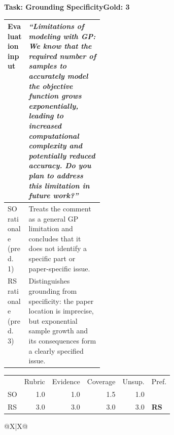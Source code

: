 \begin{table}[!t]
\vspace{0.7\baselineskip}
\begin{minipage}{\textwidth}
\hfuzz=2pt
\normalsize\linespread{1.05}\selectfont
\renewcommand{\arraystretch}{1.08}
\textbf{Task: Grounding Specificity}\hfill\textbf{Gold: 3}\\[2pt]
\begin{tabularx}{0.95\linewidth}{@{}>{\raggedright\arraybackslash}p{0.22\linewidth}X@{}}
\toprule
Evaluation input & \textit{``Limitations of modeling with GP: We know that the
required number of samples to accurately model the objective function grows
exponentially, leading to increased computational complexity and potentially
reduced accuracy. Do you plan to address this limitation in future work?''} \\
\midrule
SO rationale (pred. 1) & Treats the comment as a general GP limitation and
concludes that it does not identify a specific part or paper-specific issue. \\
RS rationale (pred. 3) & Distinguishes grounding from specificity: the paper
location is imprecise, but exponential sample growth and its consequences form
a clearly specified issue. \\
\bottomrule
\end{tabularx}
\vspace{2pt}
{\normalsize
\setlength{\tabcolsep}{0.6pt}
\begin{tabular*}{0.95\linewidth}{@{\extracolsep{\fill}}lrrrrl@{}}
& Rubric & Evidence & Coverage & Unsup. & Pref. \\
SO & 1.0 & 1.0 & 1.5 & 1.0 & \\
RS & 3.0 & 3.0 & 3.0 & 3.0 & \textbf{RS} \\
\end{tabular*}}
\captionsetup{hypcap=false,width=0.96\linewidth}
\label{tab:rationale-quality-example}
\end{minipage}
\vspace{0.8\baselineskip}
\begin{minipage}{\textwidth}
\normalsize\linespread{1.05}\selectfont
\setlength{\tabcolsep}{7pt}
\renewcommand{\arraystretch}{1.12}
\begin{tabularx}{\linewidth}{@{}X|X@{}}
\toprule
{}
\end{tabularx}
\end{minipage}
\end{table}
